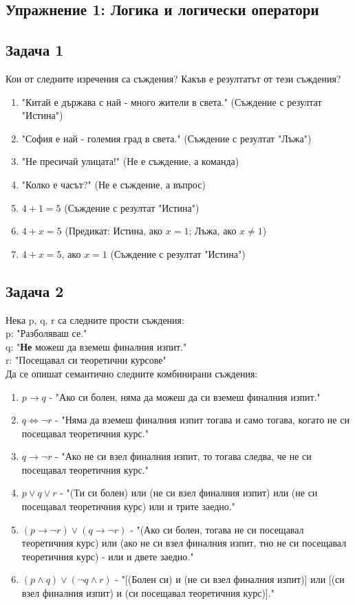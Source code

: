 \documentclass[fleqn, 12pt]{article}
\theoremstyle{definition}
\begin{document}
\subsection{Упражнение 1: Логика и логически оператори}

\subsection*{Задача 1}
Кои от следните изречения са съждения? Какъв е резултатът от тези съждения?
\begin{enumerate}
\item "Китай е държава с най - много жители в света." (Съждение с резултат "Истина")
\item "София е най - големия град в света." (Съждение с резултат "Лъжа")
\item "Не пресичай улицата!" (Не е съждение, а команда)
\item "Колко е часът?" (Не е съждение, а въпрос)
\item $4 + 1 = 5$ (Съждение с резултат "Истина")
\item $4 + x = 5$ (Предикат: Истина, ако $x = 1$; Лъжа, ако $x \neq 1$)
\item $4 + x = 5$, ако $x = 1$ (Съждение с резултат "Истина")
\end{enumerate}

\subsection*{Задача 2}
Нека p, q, r са следните прости съждения:\\
p: "Разболяваш се." \\
q: "\textbf{Не} можеш да вземеш финалния изпит." \\
r: "Посещавал си теоретични курсове" \\
Да се опишат семантично следните комбинирани съждения:
\begin{enumerate}
\item $p \to q$ - "Ако си болен, няма да можеш да си вземеш финалния изпит."
\item $q \Leftrightarrow \neg r$ - "Няма да вземеш финалния изпит тогава и само тогава, когато не си посещавал теоретичния курс."
\item $q \to \neg r$ - "Ако не си взел финалния изпит, то тогава следва, че не си посещавал теоретичния курс."
\item $p \lor q \lor r$ - "(Ти си болен) или (не си взел финалния изпит) или (не си посещавал теоретичния курс) или и трите заедно."
\item $(p \to \neg r) \lor (q \to \neg r)$ - "(Ако си болен, тогава не си посещавал теоретичния курс) или (ако не си взел финалния изпит, тно не си посещавал теоретичния курс) - или и двете заедно."
\item $(p \land q) \lor (\neg q \land r)$ - "[(Болен си) и (не си взел финалния изпит)] или [(си взел финалния изпит) и (си посещавал теоретичния курс)]."
\end{enumerate}
\end{document}
